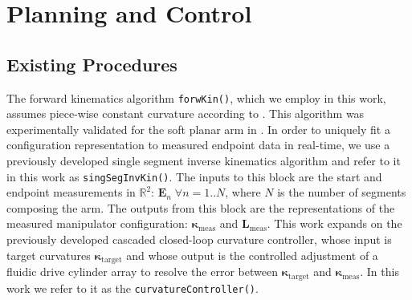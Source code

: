 \section{Planning and Control}
\label{sec:processing_and_control}
\subsection{Existing Procedures}
The forward kinematics algorithm \texttt{forwKin()}, which we employ in this work, assumes piece-wise constant curvature according to \cite{webster2010design}. 
This algorithm was experimentally validated for the soft planar arm in \cite{marchese2014design}.
In order to uniquely fit a configuration representation to measured endpoint data in real-time, we use a previously developed single segment inverse kinematics algorithm \cite{marchese2014design} and refer to it in this work as \texttt{singSegInvKin()}.
The inputs to this block are the start and endpoint measurements in $\mathbb{R}^2$: $\mathbf{E}_n \; \forall n  = 1..N$, where $N$ is the number of segments composing the arm.
The outputs from this block are the representations of the measured manipulator configuration: $\boldsymbol{\kappa}_{\textrm{meas}}$ and $\mathbf{L}_{\textrm{meas}}$.
This work expands on the previously developed cascaded closed-loop curvature controller, whose input is target curvatures $\boldsymbol{\kappa}_{\textrm{target}}$ and whose output is the controlled adjustment of a fluidic drive cylinder array to resolve the error between $\boldsymbol{\kappa}_{\textrm{target}}$ and $\boldsymbol{\kappa}_{\textrm{meas}}$.
In this work we refer to it as the \texttt{curvatureController()}.


